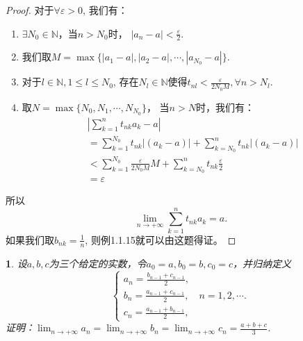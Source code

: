 \documentclass[utf8]{book}
\newtheorem{example}{}[section]             %
\begin{document}
\begin{proof}
对于$\forall \varepsilon > 0$, 我们有：
\begin{enumerate}
\renewcommand\labelenumi{\normalfont(\theenumi)}
\item $\exists N_0\in \mathbb{N}$，当$n > N_0$时， $\left| a_n - a\right| < \frac{\varepsilon}{2}$.
\item 我们取$M = \max\{|a_1 - a|, |a_2 - a|, \cdots, |a_{N_0} - a|\}$.
\item 对于$l\in\mathbb{N}, 1 \leq l \leq N_{0}$, 存在$N_l \in \mathbb{N}$使得$t_{nl} < \frac{\varepsilon}{2N_0M}, \forall n > N_l$.
\item 取$N = \max \{N_0, N_1, \cdots, N_{N_0}\}$， 当$n > N$时，我们有：
\begin{equation*}
\begin{split}
&\left | \displaystyle \sum_{k=1}^nt_{nk}a_k - a \right | \\
&= \displaystyle \sum_{k=1}^{N_0}t_{nk}\left |(a_k-a)\right| + \displaystyle \sum_{k=N_{0}}^{n}t_{nk}\left |(a_k-a)\right|\\
&< \displaystyle \sum_{k=1}^{N_0}\frac{\varepsilon}{2N_0M}M + \displaystyle \sum_{k=N_{0}}^{n}t_{nk}\frac{\varepsilon}{2}\\
&=\varepsilon
\end{split}
\end{equation*}
\end{enumerate}
所以$$\displaystyle \lim_{n\to +\infty}\sum_{k=1}^nt_{nk}a_k = a.$$
如果我们取$b_{nk} = \frac{1}{n}$, 则例1.1.15就可以由这题得证。
\end{proof}
\begin{example}
设$a,b,c$为三个给定的实数，令$a_0=a,b_0=b,c_0=c$，并归纳定义
\begin{equation*}
\begin{cases}
a_n = \frac{b_{n-1}+c_{n-1}}{2},\\
b_n = \frac{a_{n-1}+c_{n-1}}{2}, \quad n=1,2,\cdots.\\
c_n = \frac{a_{n-1}+b_{n-1}}{2},
\end{cases}
\end{equation*}
证明：$\displaystyle \lim_{n\to +\infty}a_n = \lim_{n\to +\infty}b_n=\lim_{n\to +\infty}c_n = \frac{a+b+c}{3}$.
\end{example}
\end{document}
